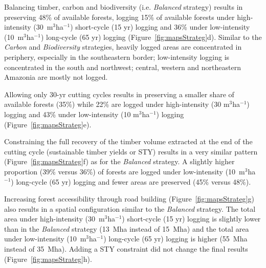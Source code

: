 \documentclass{article}
\begin{document}
Balancing timber, carbon and biodiversity (i.e. \textit{Balanced} strategy) results in preserving 48\% of available forests, logging 15\% of available forests under high-intensity (30~m$^3$ha$^{-1}$) short-cycle (15 yr) logging and 36\% under low-intensity (10~m$^3$ha$^{-1}$) long-cycle (65 yr) logging (Figure~\ref{fig:mapsStrateg}d). Similar to the \textit{Carbon} and \textit{Biodiversity} strategies, heavily logged areas are concentrated in periphery, especially in the southeastern border; low-intensity logging is concentrated in the south and northwest; central, western and northeastern Amazonia are mostly not logged. 

Allowing only 30-yr cutting cycles results in preserving a smaller share of available forests (35\%) while 22\% are logged under high-intensity (30 m$^3$ha$^{-1}$) logging and 43\% under low-intensity (10 m$^3$ha$^{-1}$) logging (Figure~\ref{fig:mapsStrateg}e). 

Constraining the full recovery of the timber volume extracted at the end of the cutting cycle (sustainable timber yields or STY) results in a very similar pattern (Figure~\ref{fig:mapsStrateg}f) as for the \textit{Balanced} strategy. A slightly higher proportion (39\% versus 36\%) of forests are logged under low-intensity (10~m$^3$ha$^{-1}$) long-cycle (65 yr) logging and fewer areas are preserved (45\% versus 48\%). 

Increasing forest accessibility through road building (Figure~\ref{fig:mapsStrateg}g) also results in a spatial configuration similar to the \textit{Balanced} strategy. The total area under high-intensity (30~m$^3$ha$^{-1}$) short-cycle (15 yr) logging is slightly lower than in the \textit{Balanced} strategy (13~Mha instead of 15~Mha) and the total area under low-intensity (10~m$^3$ha$^{-1}$) long-cycle (65 yr) logging is higher (55~Mha instead of 35~Mha). Adding a STY constraint did not change the final results (Figure~\ref{fig:mapsStrateg}h). 
\end{document}
